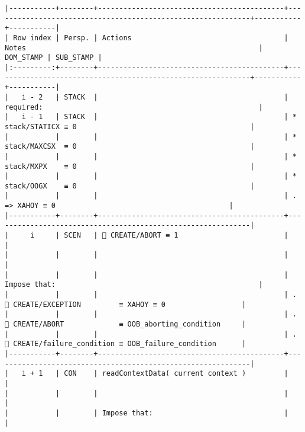 \documentclass[varwidth=\maxdimen,margin=0.5cm,multi={verbatim}]{standalone}
\begin{document}
\begin{verbatim}
|-----------+--------+--------------------------------------------+-------------------------------------------------------------+-----------+-----------|
| Row index | Persp. | Actions                                    | Notes                                                       | DOM_STAMP | SUB_STAMP |
|:---------:+--------+--------------------------------------------+-------------------------------------------------------------+-----------+-----------|
|   i - 2   | STACK  |                                            | required:                                                   |
|   i - 1   | STACK  |                                            | * stack/STATICX ≡ 0                                         |
|           |        |                                            | * stack/MAXCSX  ≡ 0                                         |
|           |        |                                            | * stack/MXPX    ≡ 0                                         |
|           |        |                                            | * stack/OOGX    ≡ 0                                         |
|           |        |                                            | .      => XAHOY ≡ 0                                         |
|-----------+--------+--------------------------------------------+-------------------------------------------------------------|
|     i     | SCEN   |  CREATE/ABORT ≡ 1                         |                                                             |
|           |        |                                            |                                                             |
|           |        |                                            | Impose that:                                                |
|           |        |                                            | .    CREATE/EXCEPTION         ≡ XAHOY ≡ 0                  |
|           |        |                                            | .    CREATE/ABORT             ≡ OOB_aborting_condition     |
|           |        |                                            | .    CREATE/failure_condition ≡ OOB_failure_condition      |
|-----------+--------+--------------------------------------------+-------------------------------------------------------------|
|   i + 1   | CON    | readContextData( current context )         |                                                             |
|           |        |                                            |                                                             |
|           |        | Impose that:                               |                                                             |

\end{verbatim}
\end{document}
